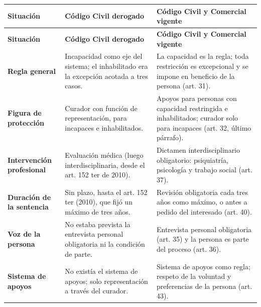 \documentclass[12pt,oneside]{book}
\begin{document}
\begin{longtable}{
    >{\raggedright\arraybackslash}p{}
    >{\raggedright\arraybackslash}p{}
    >{\raggedright\arraybackslash}p{}
}
\toprule
\textbf{Situación} & \textbf{Código Civil derogado} & \textbf{Código Civil y Comercial vigente} \\
\midrule
\endfirsthead
\toprule
\textbf{Situación} & \textbf{Código Civil derogado} & \textbf{Código Civil y Comercial vigente} \\
\midrule
\endhead

\textbf{Regla general} & Incapacidad como eje del sistema; el inhabilitado era la excepción acotada a tres casos. & La capacidad es la regla; toda restricción es excepcional y se impone en beneficio de la persona (art. 31). \\[0.4em]

\textbf{Figura de protección} & Curador con función de representación, para incapaces e inhabilitados. & Apoyos para personas con capacidad restringida e inhabilitados; curador solo para incapaces (art. 32, último párrafo). \\[0.4em]

\textbf{Intervención profesional} & Evaluación médica (luego interdisciplinaria, desde el art. 152 ter de 2010). & Dictamen interdisciplinario obligatorio: psiquiatría, psicología y trabajo social (art. 37). \\[0.4em]

\textbf{Duración de la sentencia} & Sin plazo, hasta el art. 152 ter (2010), que fijó un máximo de tres años. & Revisión obligatoria cada tres años como máximo, o antes a pedido del interesado (art. 40). \\[0.4em]

\textbf{Voz de la persona} & No estaba prevista la entrevista personal obligatoria ni la condición de parte. & Entrevista personal obligatoria (art. 35) y la persona es parte del proceso (art. 36). \\[0.4em]

\textbf{Sistema de apoyos} & No existía el sistema de apoyos; solo representación a través del curador. & Sistema de apoyos como regla; respeto de la voluntad y preferencias de la persona (art. 43). \\
\bottomrule
\end{longtable}

\end{document}
